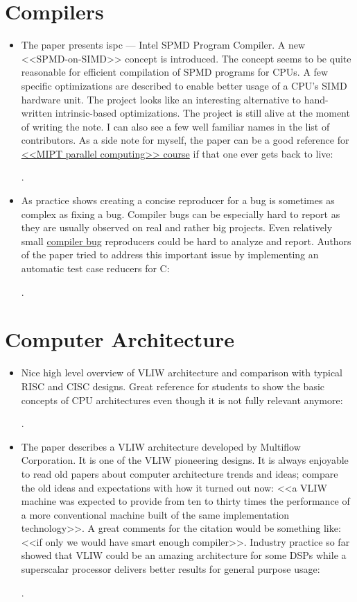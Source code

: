 \section*{Compilers}
\begin{itemize}
    \item The paper presents ispc --- Intel SPMD Program Compiler. A new <<SPMD-on-SIMD>> concept is introduced. The concept seems to be quite reasonable for efficient compilation of SPMD programs for CPUs. A few specific optimizations are described to enable better usage of a CPU's SIMD hardware unit. The project looks like an interesting alternative to hand-written intrinsic-based optimizations. The project is still alive at the moment of writing the note. I can also see a few well familiar names in the list of contributors. As a side note for myself, the paper can be a good reference for \href{https://github.com/yulyugin/mipt-parallel-computing}{<<MIPT parallel computing>> course} if that one ever gets back to live:

    \cite{Pharr:ispc:2012}.

    \item As practice shows creating a concise reproducer for a bug is sometimes as complex as fixing a bug. Compiler bugs can be especially hard to report as they are usually observed on real and rather big projects. Even relatively small \href{https://yulyugin.github.io/blog/2022/icc-bug}{compiler bug} reproducers could be hard to analyze and report. Authors of the paper tried to address this important issue by implementing an automatic test case reducers for C:

    \cite{Regehr:C-Reduce:2012}.
\end{itemize}

\section*{Computer Architecture}
\begin{itemize}
    \item Nice high level overview of VLIW architecture and comparison with typical RISC and CISC designs. Great reference for students to show the basic concepts of CPU architectures even though it is not fully relevant anymore:

    \cite{Philips:VLIW:1997}.

    \item The paper describes a VLIW architecture developed by Multiflow Corporation. It is one of the VLIW pioneering designs. It is always enjoyable to read old papers about computer architecture trends and ideas; compare the old ideas and expectations with how it turned out now: <<a VLIW machine was expected to provide from ten to thirty times the performance of a more conventional machine built of the same implementation technology>>. A great comments for the citation would be something like: <<if only we would have smart enough compiler>>. Industry practice so far showed that VLIW could be an amazing architecture for some DSPs while a superscalar processor delivers better results for general purpose usage:

    \cite{Colwell:Multiflow-VLIW:1987}.
\end{itemize}

